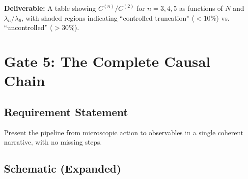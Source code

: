\documentclass[12pt,a4paper]{article}
\begin{document}
\textbf{Deliverable:} A table showing \(C^{(n)}/C^{(2)}\) for \(n = 3, 4, 5\) as functions of \(N\) and \(\lambda_n/\lambda_6\), with shaded regions indicating ``controlled truncation'' (\(< 10\%\)) vs. ``uncontrolled'' (\(> 30\%\)).

\section{Gate 5: The Complete Causal Chain}

\subsection{Requirement Statement}

Present the pipeline from microscopic action to observables in a single coherent narrative, with no missing steps.

\subsection{Schematic (Expanded)}
\end{document}
